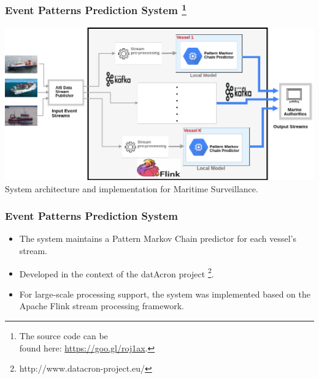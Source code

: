 \frame
{
	\frametitle{Event Patterns Prediction System \footnote{ The source code can be\\ found here: \url{https://goo.gl/roj1ax}.}}
	\begin{center}
		\includegraphics[width=1.05\textwidth,left]{figures/architecture.png}	\linebreak\\
	 System architecture and implementation for Maritime Surveillance.
		
	\end{center}
}


\frame
{
	\frametitle{Event Patterns Prediction System}
	\begin{itemize}
		
		\item<only@1> The system maintains a Pattern Markov Chain predictor for each vessel's stream. 
		\item<only@1> Developed in the context of the datAcron project \footnote{http://www.datacron-project.eu/}.
		\item<only@1> For large-scale processing support, the system was implemented based on the Apache Flink \citep{carbone2015apache} stream processing framework. 
	\end{itemize}
}